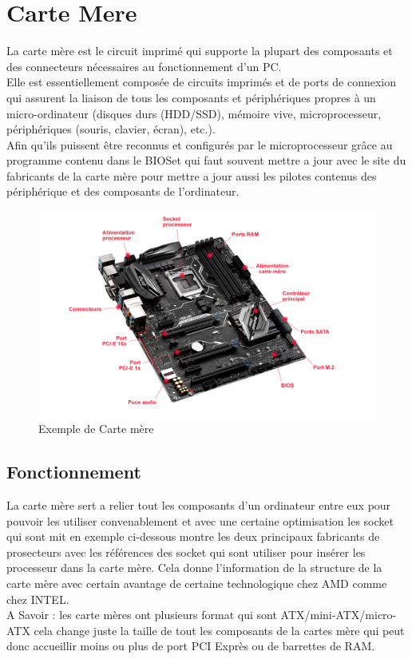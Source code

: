 \documentclass[a4paper,12pt]{article}
\begin{document}
    \section{Carte Mere}
        La carte mère est le circuit imprimé qui supporte la plupart des composants et des connecteurs nécessaires au fonctionnement d'un PC. \\
        Elle est essentiellement composée de circuits imprimés et de ports de connexion qui assurent la liaison de tous les composants et périphériques propres à un micro-ordinateur (disques durs (HDD/SSD), mémoire vive, microprocesseur, périphériques (souris, clavier, écran), etc.). \\
        Afin qu'ils puissent être reconnus et configurés par le microprocesseur grâce au programme contenu dans le BIOS\footnotemark[1] et qui faut souvent mettre a jour avec le site du fabricants de la carte mère pour mettre a jour aussi les pilotes contenus des périphérique et des composants de l'ordinateur.
        \begin{figure}[h!]
            \centering
            \includegraphics[scale=0.45]{Carte_mere.jpg}
            \caption{Exemple de Carte mère}
            \label{fig: Exemple de Carte mère}
        \end{figure}
   
   
    \newpage
        
        \subsection{Fonctionnement}
            La carte mère sert a relier tout les composants d'un ordinateur entre eux pour pouvoir les utiliser convenablement et avec une certaine optimisation les socket qui sont mit en exemple ci-dessous montre les deux principaux fabricants de prosecteurs avec les références des socket qui sont utiliser pour insérer les processeur dans la carte mère. Cela donne l'information de la structure de la carte mère avec certain avantage de certaine technologique chez AMD comme chez INTEL. \\
            A Savoir : les carte mères ont plusieurs format qui sont ATX/mini-ATX/micro-ATX
            cela change juste la taille de tout les composants de la cartes mère qui peut donc accueillir moins ou plus de port PCI Exprès ou de barrettes de RAM.
    
\end{document}
